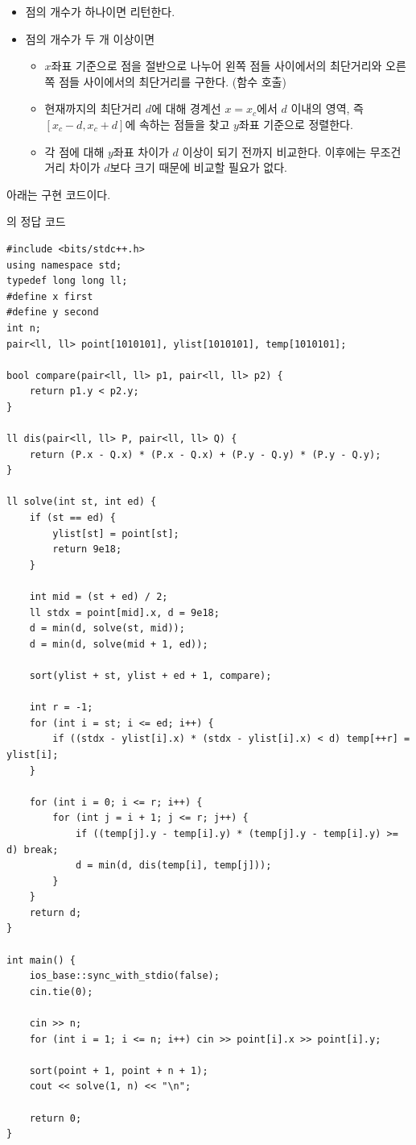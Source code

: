 \begin{itemize}
    \item 점의 개수가 하나이면 리턴한다.
    \item 점의 개수가 두 개 이상이면
    \begin{itemize}
        \item $x$좌표 기준으로 점을 절반으로 나누어 왼쪽 점들 사이에서의 최단거리와 오른쪽 점들 사이에서의 최단거리를 구한다. (함수 호출)
        \item 현재까지의 최단거리 $d$에 대해 경계선 $x=x_c$에서 $d$ 이내의 영역, 즉 $[x_c - d, x_c + d]$에 속하는 점들을 찾고 $y$좌표 기준으로 정렬한다.
        \item 각 점에 대해 $y$좌표 차이가 $d$ 이상이 되기 전까지 비교한다. 이후에는 무조건 거리 차이가 $d$보다 크기 때문에 비교할 필요가 없다.
    \end{itemize}
\end{itemize}

아래는 구현 코드이다.

\begin{code} \label{code: nearest-two-points}
의 정답 코드
\begin{lstlisting}
#include <bits/stdc++.h>
using namespace std;
typedef long long ll;
#define x first
#define y second
int n;
pair<ll, ll> point[1010101], ylist[1010101], temp[1010101];

bool compare(pair<ll, ll> p1, pair<ll, ll> p2) {
    return p1.y < p2.y;
}
 
ll dis(pair<ll, ll> P, pair<ll, ll> Q) {
    return (P.x - Q.x) * (P.x - Q.x) + (P.y - Q.y) * (P.y - Q.y);
}
 
ll solve(int st, int ed) {
    if (st == ed) {
        ylist[st] = point[st];
        return 9e18;
    }
 
    int mid = (st + ed) / 2;
    ll stdx = point[mid].x, d = 9e18;
    d = min(d, solve(st, mid));
    d = min(d, solve(mid + 1, ed));
 
    sort(ylist + st, ylist + ed + 1, compare);
 
    int r = -1;
    for (int i = st; i <= ed; i++) {
        if ((stdx - ylist[i].x) * (stdx - ylist[i].x) < d) temp[++r] = ylist[i];
    }

    for (int i = 0; i <= r; i++) {
        for (int j = i + 1; j <= r; j++) {
            if ((temp[j].y - temp[i].y) * (temp[j].y - temp[i].y) >= d) break;
            d = min(d, dis(temp[i], temp[j]));
        }
    }
    return d;
}
 
int main() {
    ios_base::sync_with_stdio(false);
    cin.tie(0);
 
    cin >> n;
    for (int i = 1; i <= n; i++) cin >> point[i].x >> point[i].y;
 
    sort(point + 1, point + n + 1);
    cout << solve(1, n) << "\n";
 
    return 0;
}
\end{lstlisting}
\end{code}

